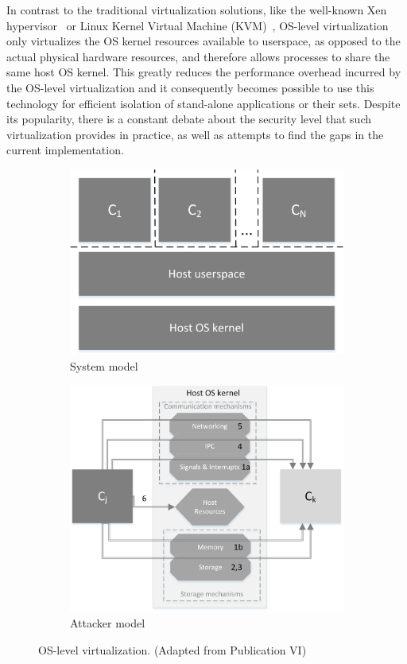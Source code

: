 In contrast to the traditional virtualization solutions, like the well-known Xen hypervisor~\cite{xenproject} or Linux Kernel Virtual Machine (KVM)~\cite{kvmproject}, OS-level virtualization only virtualizes the OS kernel resources available to userspace, as opposed to the actual physical hardware resources, and therefore allows processes to share the same host OS kernel. This greatly reduces the performance overhead incurred by the OS-level virtualization and it consequently becomes possible to use this technology for efficient isolation of stand-alone applications or their sets. Despite its popularity, there is a constant debate about the security level that such virtualization provides in practice, as well as attempts to find the gaps in the current implementation. 


\begin{figure}[t]
\centering
\begin{subfigure}{.5\textwidth}
  \centering
  \includegraphics[width=0.8\linewidth]{figures/os-virtualization-sys-model.png}
  \caption{System model}
  \label{fig:osv-1}
\end{subfigure}%
\begin{subfigure}{.5\textwidth}
  \centering
  \includegraphics[width=1\linewidth]{figures/OS-virtualization-attacker-model.png}
  \caption{Attacker model}
  \label{fig:osv-2}
\end{subfigure}
\caption{OS-level virtualization. (Adapted from Publication VI)}
\label{fig:os-virtualization}
\end{figure}

